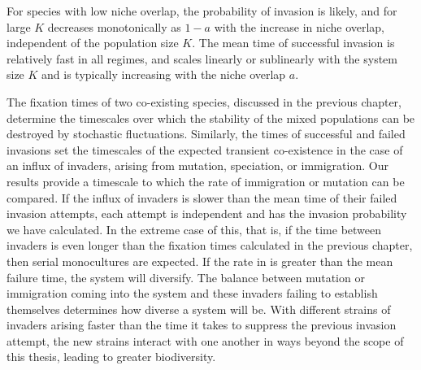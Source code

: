 For species with low niche overlap, the probability of invasion is likely, and for large $K$ decreases monotonically as $1-a$ with the increase in niche overlap, independent of the population size $K$. 
The mean time of successful invasion is relatively fast in all regimes, and scales linearly or sublinearly with the system size $K$ and is typically increasing with the niche overlap $a$.

The fixation times of two co-existing species, discussed in the previous chapter, determine the timescales over which the stability of the mixed populations can be destroyed by stochastic fluctuations. 
Similarly, the times of successful and failed invasions set the timescales of the expected transient co-existence in the case of an influx of invaders, arising from mutation, speciation, or immigration. 
Our results provide a timescale to which the rate of immigration or mutation can be compared. 
If the influx of invaders is slower than the mean time of their failed invasion attempts, each attempt is independent and has the invasion probability we have calculated. 
In the extreme case of this, that is, if the time between invaders is even longer than the fixation times calculated in the previous chapter, then serial monocultures are expected.
If the rate in is greater than the mean failure time, the system will diversify. 
The balance between mutation or immigration coming into the system and these invaders failing to establish themselves determines how diverse a system will be. %
With different strains of invaders arising faster than the time it takes to suppress the previous invasion attempt, the new strains interact with one another in ways beyond the scope of this thesis, leading to greater biodiversity. 
